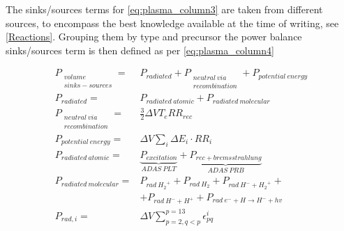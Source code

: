 
The sinks/sources terms for \autoref{eq:plasma_column3} are taken from different sources, to encompass the best knowledge available at the time of writing, see \autoref{Reactions}. Grouping them by type and precursor the power balance sinks/sources term is then defined as per \autoref{eq:plasma_column4}

\begin{equation}
\label{eq:plasma_column4}
\begin{aligned}
P_{ \substack{volume \\ sinks-sources}} =& P_{ radiated } + P_{ \substack{neutral\ via \\ recombination} } + P_{ potential\ energy }
\\
P_{ radiated } =& P_{ radiated\ atomic } + P_{ radiated\ molecular } 
\\
P_{ \substack{neutral\ via \\ recombination} } =& \frac{3}{2} \Delta V T_e RR_{rec}
\\
P_{ potential\ energy } =& \Delta V \sum_{i} { {\Delta E}_i \cdot RR_i } 
\\
P_{ radiated\ atomic } =& \underbrace{P_{ excitation }}_{ADAS\ PLT} + \underbrace{P_{ rec + bremsstrahlung }}_{ADAS\ PRB}
\\
P_{ radiated\ molecular } =& P_{ rad\ {H_2}^+{} } + P_{ rad\ {H_2} } + P_{ rad\ {H}^-{}+{H_2}^+{} } + \\ &+ P_{ rad\ {H}^-{}+{H}^+{} } + P_{ rad\ e^-{} + H \rightarrow {H}^-{}+hv } 
\\
P_{ rad,i } =& \Delta V \sum_{p=2,q<p}^{p=13} \epsilon^{i}_{pq}
\end{aligned}
\end{equation}


